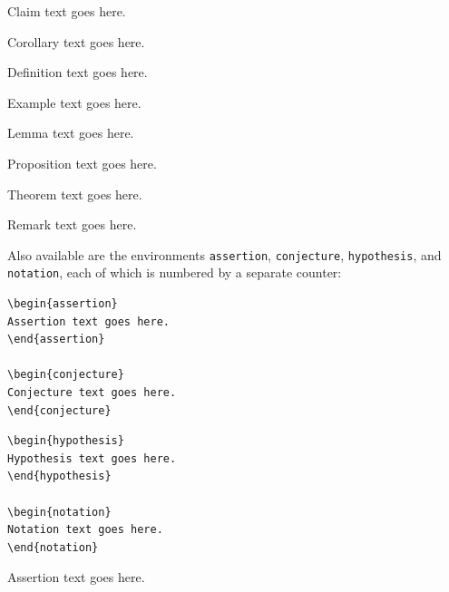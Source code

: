 \documentclass[11pt]{article}
\begin{document}
\begin{claim}
Claim text goes here.
\end{claim}

\begin{corollary}
\label{cor1}
Corollary text goes here.
\end{corollary}

\begin{definition}
\label{def1}
Def{i}nition text goes here.
\end{definition}

\begin{example}
\label{ex1}
Example text goes here.
\end{example}

\begin{lemma}
\label{lem1}
Lemma text goes here.
\end{lemma}
	
\begin{proposition}
\label{prop1}
Proposition text goes here.
\end{proposition}


\begin{theorem}
\label{thm1}
Theorem text goes here.
\end{theorem}

\begin{remark}
\label{rem1}
Remark text goes here.
\end{remark}
\noindent Also available are the environments \texttt{assertion}, \texttt{conjecture}, \texttt{hypothesis},
and \texttt{notation}, each of which is numbered by a separate counter:
\begin{verbatim}
\begin{assertion}
Assertion text goes here.
\end{assertion}

\begin{conjecture}
Conjecture text goes here.
\end{conjecture}
\end{verbatim}


\begin{verbatim}
\begin{hypothesis}
Hypothesis text goes here.
\end{hypothesis}

\begin{notation}
Notation text goes here.
\end{notation}
\end{verbatim}
\begin{assertion}
Assertion text goes here.
\end{assertion}
\end{document}
